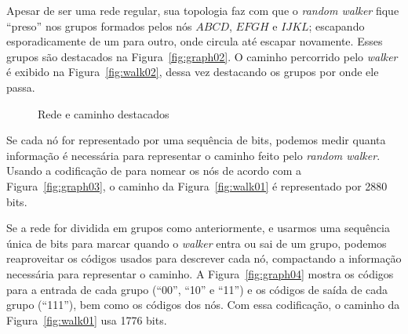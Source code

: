 \documentclass[
  article,
  11pt,
  a4paper,
  english,
  brazil,
  sumario=tradicional]{abntex2}
\begin{document}
Apesar de ser uma rede regular, sua topologia faz com que o \textit{random walker} fique \enquote{preso} nos grupos formados pelos nós $ABCD$, $EFGH$ e $IJKL$; escapando esporadicamente de um para outro, onde circula até escapar novamente. Esses grupos são destacados na Figura~\ref{fig:graph02}. O caminho percorrido pelo \textit{walker} é exibido na Figura~\ref{fig:walk02}, dessa vez destacando os grupos por onde ele passa.

\begin{figure}[ht]
  \centering
  \caption{Rede e caminho destacados}
\end{figure}

Se cada nó for representado por uma sequência de bits, podemos medir quanta informação é necessária para representar o caminho feito pelo \textit{random walker}. Usando a codificação de  para nomear os nós de acordo com a Figura~\ref{fig:graph03}, o caminho da Figura~\ref{fig:walk01} é representado por 2880 bits.

Se a rede for dividida em grupos como anteriormente, e usarmos uma sequência única de bits para marcar quando o \textit{walker} entra ou sai de um grupo, podemos reaproveitar os códigos usados para descrever cada nó, compactando a informação necessária para representar o caminho. A Figura~\ref{fig:graph04} mostra os códigos para a entrada de cada grupo (\enquote{00}, \enquote{10} e \enquote{11}) e os códigos de saída de cada grupo (\enquote{111}), bem como os códigos dos nós. Com essa codificação, o caminho da Figura~\ref{fig:walk01} usa 1776 bits.
\end{document}
